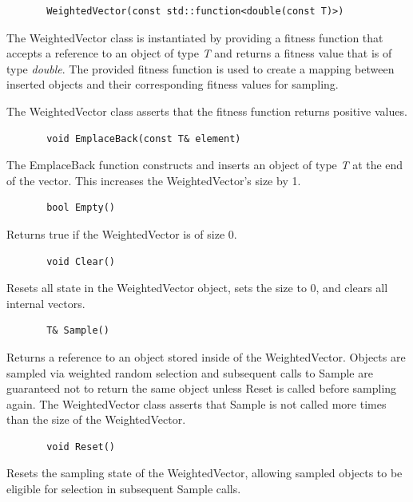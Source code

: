 \documentclass[12pt]{article}
\begin{document}
     \begin{verbatim}
       WeightedVector(const std::function<double(const T)>)
     \end{verbatim}

     The WeightedVector class is instantiated by providing a fitness function
     that accepts a reference to an object of type \emph{T} and returns a
     fitness value that is of type \emph{double}. The provided fitness function
     is used to create a mapping between inserted objects and their
     corresponding fitness values for sampling.

     The WeightedVector class asserts that the fitness function returns positive
     values.

     \begin{verbatim}
       void EmplaceBack(const T& element)
     \end{verbatim}

     The EmplaceBack function constructs and inserts an object of type
     \emph{T} at the end of the vector. This increases the WeightedVector's
     size by 1.

     \begin{verbatim}
       bool Empty()
     \end{verbatim}

     Returns true if the WeightedVector is of size 0.

     \begin{verbatim}
       void Clear()
     \end{verbatim}

     Resets all state in the WeightedVector object, sets the size to 0, and
     clears all internal vectors.

     \begin{verbatim}
       T& Sample()
     \end{verbatim}

     Returns a reference to an object stored inside of the WeightedVector.
     Objects are sampled via weighted random selection and subsequent calls to
     Sample are guaranteed not to return the same object unless Reset is called
     before sampling again. The WeightedVector class asserts that Sample is not
     called more times than the size of the WeightedVector.

     \begin{verbatim}
       void Reset()
     \end{verbatim}

     Resets the sampling state of the WeightedVector, allowing sampled objects
     to be eligible for selection in subsequent Sample calls.
\end{document}
